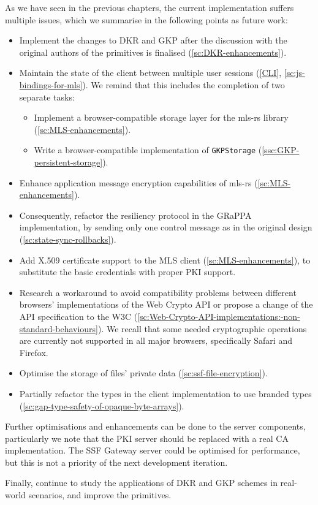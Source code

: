As we have seen in the previous chapters,
the current implementation suffers multiple issues,
which we summarise in the following points as future work:
\begin{itemize}
    \item Implement the changes to DKR and GKP after the discussion with the original authors of the primitives is finalised (\cref{sc:DKR-enhancements}).
    \item Maintain the state of the client between multiple user sessions (\cref{CLI}, \cref{sc:js-bindings-for-mls}). We remind that this includes the completion of two separate tasks:
    \begin{itemize}
        \item Implement a browser-compatible storage layer for the mls-rs library (\cref{sc:MLS-enhancements}).
        \item Write a browser-compatible implementation of \texttt{GKPStorage} (\cref{ssc:GKP-persistent-storage}).
    \end{itemize}
    \item Enhance application message encryption capabilities of mls-rs (\cref{sc:MLS-enhancements}).
    \item Consequently, refactor the resiliency protocol in the GRaPPA implementation, by sending only one control message as in the original design (\cref{sc:state-sync-rollbacks}).
    \item Add X.509 certificate support to the MLS client (\cref{sc:MLS-enhancements}), to substitute the basic credentials with proper PKI support.
    \item Research a workaround to avoid compatibility problems between different browsers' implementations of the Web Crypto API or propose a change of the API specification to the W3C  (\cref{sc:Web-Crypto-API-implementations:-non-standard-behaviours}). We recall that some needed cryptographic operations are currently not supported in all major browsers, specifically Safari and Firefox. 
    \item Optimise the storage of files' private data (\cref{sc:ssf-file-encryption}).
    \item Partially refactor the types in the client implementation to use branded types (\cref{sc:gap-type-safety-of-opaque-byte-arrays}).
\end{itemize}

Further optimisations and enhancements can be done
to the server components, particularly we note that
the PKI server should be replaced with a real CA
implementation. The SSF Gateway server could be optimised
for performance, but this is not a priority of the
next development iteration.

Finally, continue to study the applications of DKR and GKP schemes in
real-world scenarios, and improve the primitives.
